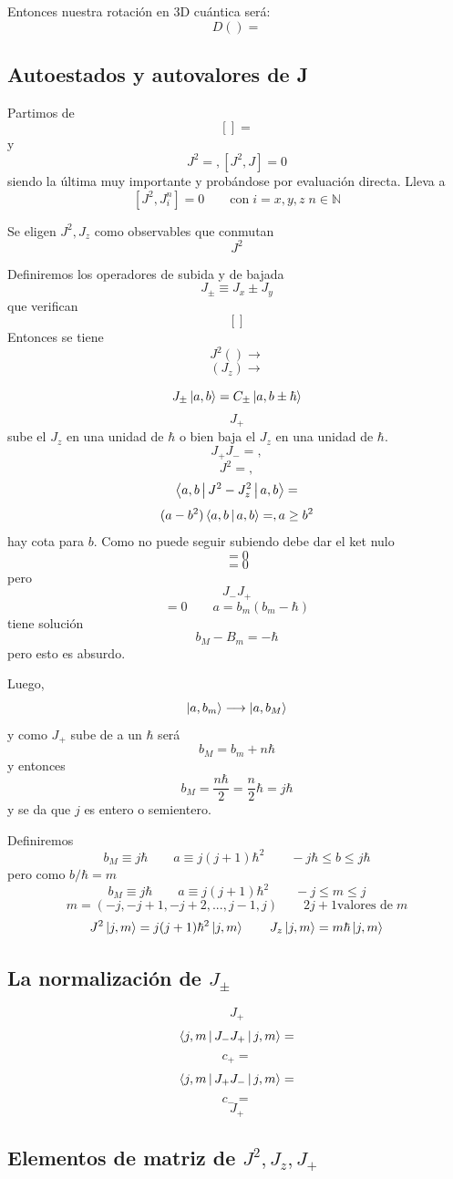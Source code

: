 \documentclass[10pt,oneside]{CBFT_book}
\begin{document}
Entonces nuestra rotación en 3D cuántica será:
\[
	D() =
\]

\subsection{Autoestados y autovalores de J}

Partimos de 
\[
	[] = 
\]
y
\[
	J^2 = , [J^2,J] = 0
\]
siendo la última muy importante y probándose por evaluación directa. Lleva a 
\[
	[J^2,J_i^n] = 0 \qquad \text{con} \; i=x,y,z \; n\in\mathbb{N}
\]

Se eligen $J^2, J_z$ como observables que conmutan 
\[
	J^2
\]

Definiremos los operadores de subida y de bajada
\[
	J_{\pm} \equiv J_x \pm J_y
\]
que verifican 
\[
	[]
\]
Entonces se tiene 
\[
	J^2() \longrightarrow 
\]
\[
	(J_z) \longrightarrow
\]

\[
	J_{\pm} \Ket{a,b} = C_{\pm} \Ket{a,b\pm\hbar}
\]
\[
	J_+
\]
sube el $J_z$ en una unidad de $\hbar$ o bien baja el $J_z$ en una unidad de $\hbar$.
\[
	J_+J_- =  ,
\]
\[
	J^2 = ,  
\]
\[
	\Braket{a,b|J^2 - J^2_z|a,b} = 
\]
\[
	(a-b^2)\Braket{a,b|a,b} = , a \geq b^2
\]
hay cota para $b$.
Como no puede seguir subiendo debe dar el ket nulo 
\[
	= 0
\]
\[
	= 0
\]
pero 
\[
	J_-J_+
\]
\[
	= 0	\qquad a = b_m(b_m-\hbar)
\]
tiene solución 
\[
	b_M - B_m = - \hbar
\]
pero esto es absurdo.

Luego,
\[
	\Ket{a,b_m} \longrightarrow \Ket{a,b_M}
\]
y como $J_+$ sube de a un $\hbar$ será
\[
	b_M = b_m + n\hbar
\]
y entonces
\[
	b_M = \frac{n\hbar}{2} = \frac{n}{2} \hbar = j \hbar
\]
y se da que $j$ es entero o semientero.

Definiremos 
\[
	b_M \equiv j \hbar \qquad a \equiv j (j+1) \hbar^2 \qquad -j\hbar \leq b \leq j\hbar
\]
pero como $b/\hbar = m$
\[
	b_M \equiv j \hbar \qquad a \equiv j (j+1) \hbar^2 \qquad -j \leq m \leq j
\]
\[
	m = (-j,-j+1,-j+2,...,j-1,j) \qquad 2j+1 \text{valores de} \; m
\]
\[
	J^2 \Ket{j,m} = j( j+1 )\hbar^2\Ket{j,m} \qquad J_z \Ket{j,m} = m \hbar \Ket{j,m}
\]

\subsection{La normalización de $J_\pm$}

\[
	J_+
\]
\[
	\Braket{j,m|J_-J_+|j,m} = 
\]
\[
	c_+ = 
\]
\[
	\Braket{j,m|J_+J_-|j,m} = 
\]
\[
	c_- =
\]
\[
	J_+
\]

\subsection{Elementos de matriz de $J^2, J_z, J_+$}
\end{document}

